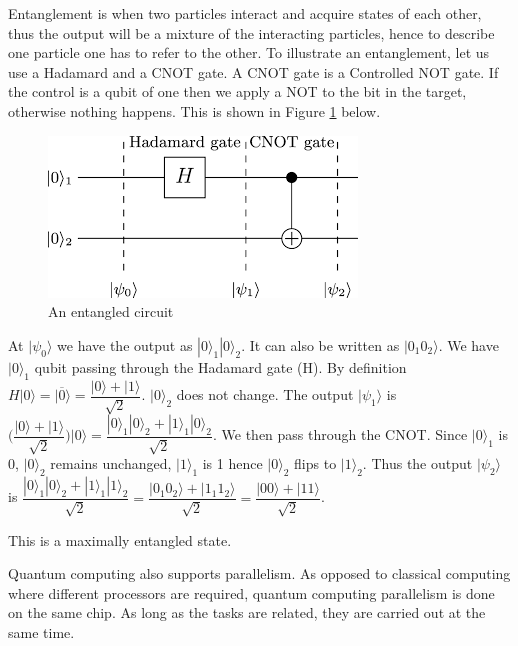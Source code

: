 Entanglement is when two particles interact and acquire states of each other, thus the output will be a mixture of the interacting particles, hence to describe one particle one has to refer to the other. To illustrate an entanglement, let us use a Hadamard and a CNOT gate. A CNOT gate is a Controlled NOT gate. If the control is a qubit of one then we apply a NOT to the bit in the target, otherwise nothing happens. This is shown in Figure \ref{fig:entanglement} below.

\begin{figure}[h]
\center
\includegraphics[scale=1]{images/entangle.png} 
\caption{An entangled circuit}
\label{fig:entanglement}
\end{figure}

At $|\psi_0 \rangle$ we have the output as $|0\rangle _1 |0\rangle _2$. It can also be written as $|0_1 0_2 \rangle$. We have $|0\rangle _1$ qubit passing through the Hadamard gate (H). By definition
$H|0\rangle =| \overline{0} \rangle = \dfrac{|0\rangle + |1\rangle}{\sqrt{2}}$. $|0\rangle _2$ does not change. The output $|\psi _1 \rangle $ is $ \bigg(\dfrac{|0\rangle + |1\rangle}{\sqrt{2}} \bigg)|0\rangle = \dfrac{|0\rangle_1 |0\rangle_2 + |1\rangle_1 |0\rangle _2}{\sqrt{2}}$. We then pass through the CNOT. Since $|0\rangle_1$ is 0, $|0\rangle_2$ remains unchanged, $|1\rangle_1$ is 1 hence $|0\rangle _2$ flips to $|1\rangle _2$. Thus the output $|\psi_2 \rangle $ is $\dfrac{|0\rangle_1 |0\rangle_2 + |1\rangle_1 |1\rangle _2}{\sqrt{2}} = \dfrac{|0_1 0_2\rangle + |1_1 1_2\rangle }{\sqrt{2}} = \dfrac{|0 0 \rangle + |1 1\rangle }{\sqrt{2}}$.

This is a maximally entangled state.

Quantum computing also supports parallelism. As opposed to classical computing where different processors are required, quantum computing parallelism is done on the same chip. As long as the tasks are related, they are carried out at the same time.

